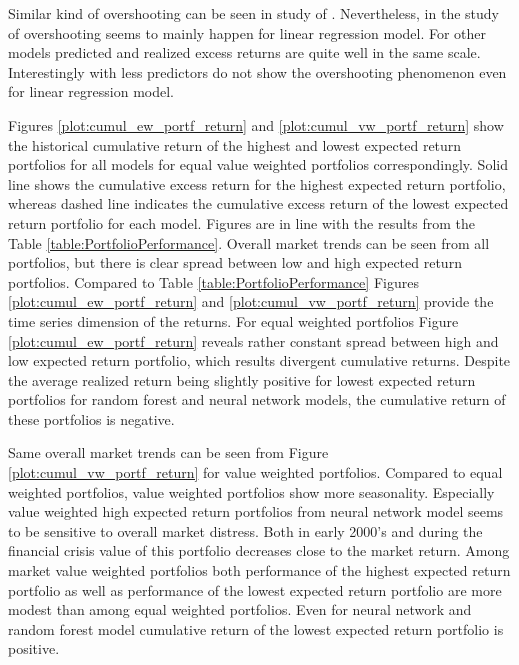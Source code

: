 \documentclass[12pt]{article}
\begin{document}
Similar kind of overshooting can be seen in study of \citet{Drobetz}. Nevertheless, in the study of \citeauthor{Drobetz} overshooting seems to mainly happen for linear regression model. For other models predicted and realized excess returns are quite well in the same scale. Interestingly with less predictors \citet{Fieberg} do not show the overshooting phenomenon even for linear regression model. \par

Figures \ref{plot:cumul_ew_portf_return} and \ref{plot:cumul_vw_portf_return} show the historical cumulative return of the highest and lowest expected return portfolios for all models for equal value weighted portfolios correspondingly. Solid line shows the cumulative excess return for the highest expected return portfolio, whereas dashed line indicates the cumulative excess return of the lowest expected return portfolio for each model. Figures are in line with the results from the Table \ref{table:PortfolioPerformance}. Overall market trends can be seen from all portfolios, but there is clear spread between low and high expected return portfolios. Compared to Table \ref{table:PortfolioPerformance} Figures \ref{plot:cumul_ew_portf_return} and \ref{plot:cumul_vw_portf_return} provide the time series dimension of the returns. For equal weighted portfolios Figure \ref{plot:cumul_ew_portf_return} reveals rather constant spread between high and low expected return portfolio, which results divergent cumulative returns. Despite the average realized return being slightly positive for lowest expected return portfolios for random forest and neural network models, the cumulative return of these portfolios is negative. \par

Same overall market trends can be seen from Figure \ref{plot:cumul_vw_portf_return} for value weighted portfolios. Compared to equal weighted portfolios, value weighted portfolios show more seasonality. Especially value weighted high expected return portfolios from neural network model seems to be sensitive to overall market distress. Both in early 2000's and during the financial crisis value of this portfolio decreases close to the market return. Among market value weighted portfolios both performance of the highest expected return portfolio as well as performance of the lowest expected return portfolio are more modest than among equal weighted portfolios. Even for neural network and random forest model cumulative return of the lowest expected return portfolio is positive. \par
\end{document}
